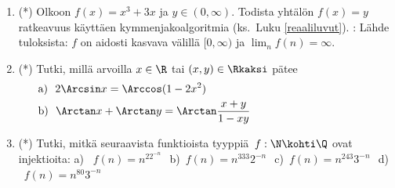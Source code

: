 \begin{enumerate}
\item(*) \label{H-IV-2: ratkeavuus kymmenjaolla}
Olkoon $f(x)=x^3+3x$ ja $y\in(0,\infty)$. Todista yhtälön $f(x)=y$ ratkeavuus käyttäen
kymmenjakoalgoritmia (ks.\ Luku \ref{reaaliluvut}). : Lähde tuloksista:
$f$ on aidosti kasvava välillä $[0,\infty)$ ja $\lim_n f(n)=\infty$.

\item (*)
Tutki, millä arvoilla $x\in\R$ tai $(x,y)\in\Rkaksi$ pätee
\begin{align*}
&\text{a)}\ \ 2\Arcsin x=\Arccos(1-2x^2) \\
&\text{b)}\ \ \Arctan x+\Arctan y=\Arctan\frac{x+y}{1-xy} \hspace{4cm}
\end{align*}

\item(*)
Tutki, mitkä seuraavista funktioista tyyppiä $\,f: \N\kohti\Q$ ovat injektioita: \newline
a) \ $f(n)=n^22^{-n}\,\ $ b)\ $f(n)=n^{333}2^{-n}\,\ $ c)\ $f(n)=n^{243}3^{-n}\,\ $ 
d) \ $f(n)=n^{80}3^{-n}$

\end{enumerate}